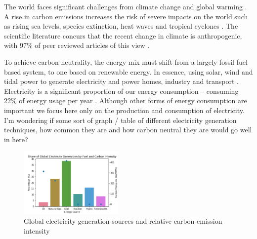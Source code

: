 
The world faces significant challenges from climate change and global warming \cite{Masson-Delmotte2018}. A rise in carbon emissions increases the risk of severe impacts on the world such as rising sea levels, species extinction, heat waves and tropical cyclones \cite{IPCC2014}. The scientific literature concurs that the recent change in climate is anthropogenic, with 97\% of peer reviewed articles of this view \cite{Cook2013}.  

To achieve carbon neutrality, the energy mix must shift from a largely fossil fuel based system, to one based on renewable energy. In essence, using solar, wind and tidal power to generate electricity and power homes, industry and transport \cite{Hoffert2002}. Electricity is a significant proportion of our energy consumption -- consuming 22\% of energy usage per year \cite{Lakshmi2017}. Although other forms of energy consumption are important we focus here only on the production and consumption of electricity. {\color{red}I'm wondering if some sort of graph / table of different electricity generation techniques, how common they are and how carbon neutral they are would go well in here?}


\begin{figure}[h]
	\begin{center}
		\includegraphics[width=0.45\textwidth]{figures/elec_gen_carbon.png}
		\caption{Global electricity generation sources and relative carbon emission intensity}
		\label{fig:fuel_emissions_market_share}
	\end{center}
\end{figure}



